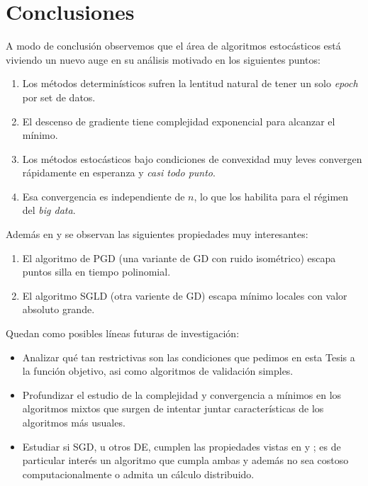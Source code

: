 \chapter{Conclusiones}\label{ch:conclusiones}

A modo de conclusi\'on observemos que el \'area de algoritmos estoc\'asticos est\'a viviendo un nuevo auge en su an\'alisis motivado en los siguientes puntos:

\begin{enumerate}
	\item Los m\'etodos determin\'isticos sufren la lentitud natural de tener un solo \textit{epoch} por set de datos.
	\item El descenso de gradiente tiene complejidad exponencial para alcanzar el m\'inimo.
	\item Los m\'etodos estoc\'asticos bajo condiciones de convexidad muy leves convergen r\'apidamente en esperanza y \textit{casi todo punto}.
	\item Esa convergencia es independiente de $n$, lo que los habilita para el r\'egimen del \textit{big data}.
\end{enumerate}

Adem\'as en \cite{jin:2017} y \cite{zhang:2017} se observan las siguientes propiedades muy interesantes:

\begin{enumerate}
	\item El algoritmo de PGD (una variante de GD con ruido isom\'etrico) escapa puntos silla en tiempo polinomial.
	\item El algoritmo SGLD (otra variente de GD) escapa m\'inimo locales con valor absoluto grande.
\end{enumerate}

Quedan como posibles l\'ineas futuras de investigaci\'on:

\begin{itemize}
	\item Analizar qu\'e tan restrictivas son las condiciones que pedimos en esta Tesis a la funci\'on objetivo, asi como algoritmos de validaci\'on simples.
	\item Profundizar el estudio de la complejidad y convergencia a m\'inimos en los algoritmos mixtos que surgen de intentar juntar caracter\'isticas de los algoritmos m\'as usuales.
	\item Estudiar si SGD, u otros DE, cumplen las propiedades vistas en \cite{jin:2017} y \cite{zhang:2017}; es de particular inter\'es un algoritmo que cumpla ambas y adem\'as no sea costoso computacionalmente o admita un c\'alculo distribuido.
\end{itemize}